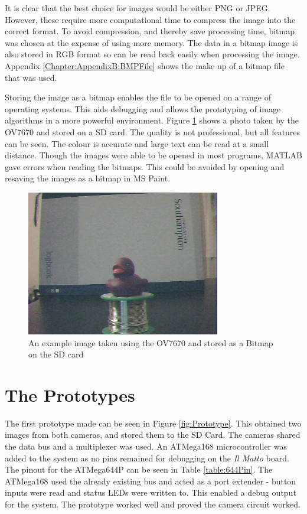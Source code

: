 It is clear that the best choice for images would be either PNG or JPEG. However, these require more computational time to compress the image into the correct format. To avoid compression, and thereby save processing time, bitmap was chosen at the expense of using more memory. The data in a bitmap image is also stored in RGB format so can be read back easily when processing the image. Appendix \ref{Chapter:AppendixB:BMPFile} shows the make up of a bitmap file that was used.

Storing the image as a bitmap enables the file to be opened on a range of operating systems. This aids debugging and allows the prototyping of image algorithms in a more powerful environment. Figure \ref{ExampleImage} shows a photo taken by the OV7670 and stored on a SD card. The quality is not professional, but all features can be seen. The colour is accurate and large text can be read at a small distance. Though the images were able to be opened in most programs, MATLAB gave errors when reading the bitmaps. This could be avoided by opening and resaving the images as a bitmap in MS Paint.

\begin{figure}
\begin{center}
\includegraphics{Figures/ExampleImageFromCamera.jpg} 
\end{center}
\caption{An example image taken using the OV7670 and stored as a Bitmap on the SD card}
\label{ExampleImage}
\end{figure}

\section{The Prototypes}

The first prototype made can be seen in Figure \ref{fig:Prototype}. This obtained two images from both cameras, and stored them to the SD Card. The cameras shared the data bus and a \itc multiplexer was used. An ATMega168 microcontroller was added to the system as no pins remained for debugging on the \textit{Il Matto} board. The pinout for the ATMega644P can be seen in Table \ref{table:644Pin}. The ATMega168 used the already existing \itc bus and acted as a port extender - button inputs were read and status LEDs were written to. This enabled a debug output for the system. The prototype worked well and proved the camera circuit worked. 

